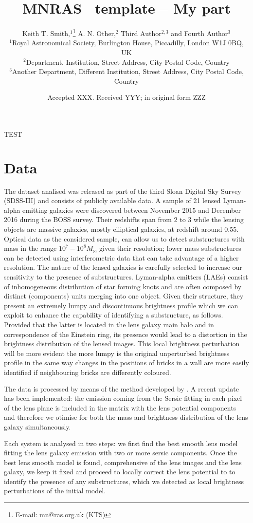 \documentclass[a4paper,fleqn,usenatbib]{mnras}
\title[Short title, max. 45 characters]{MNRAS \LaTeXe\ template -- My part}
\author[K. T. Smith et al.]{
Keith T. Smith,$^{1}$\thanks{E-mail: mn@ras.org.uk (KTS)}
A. N. Other,$^{2}$
Third Author$^{2,3}$
and Fourth Author$^{3}$
\\
$^{1}$Royal Astronomical Society, Burlington House, Piccadilly, London W1J 0BQ, UK\\
$^{2}$Department, Institution, Street Address, City Postal Code, Country\\
$^{3}$Another Department, Different Institution, Street Address, City Postal Code, Country
}
\date{Accepted XXX. Received YYY; in original form ZZZ}
\begin{document}
\label{firstpage}
\pagerange{\pageref{firstpage}--\pageref{lastpage}}
\maketitle


TEST

\section{Data}
The dataset analised was released as part of the third Sloan Digital Sky Survey (SDSS-III) and consists of publicly available data. A sample of 21 lensed Lyman-alpha emitting galaxies were discovered between November 2015 and December 2016 during the BOSS survey. Their redshifts span from 2 to 3 while the lensing objects are massive galaxies, mostly elliptical galaxies, at redshift around 0.55.
Optical data as the considered sample, can allow us to detect substructures with mass in the range $10^7 - 10^8 M_{\odot}$ given their resolution; lower mass substructures can be detected using interferometric data that can take advantage of a higher resolution.
The nature of the lensed galaxies is carefully selected to increase our sensitivity to the presence of substructures. Lyman-alpha emitters (LAEs) consist of inhomogeneous distribution of star forming knots and are often composed by distinct (components) units merging into one object. Given their structure, they present an extremely lumpy and discontinuous brightness profile which we can exploit to enhance the capability of identifying a substructure, as follows. Provided that the latter is located in the lens galaxy main halo and in correspondence of the Einstein ring, its presence would lead to a distortion in the brightness distribution of the lensed images. This local brightness perturbation will be more evident the more lumpy is the original unperturbed brightness profile in the same way changes in the positions of bricks in a wall are more easily identified if neighbouring bricks are differently coloured.

The data is processed by means of the method developed by \citet{method}. A recent update has been implemented: the emission coming from the Sersic fitting in each pixel of the lens plane is included in the matrix with the lens potential components and therefore we otimise for both the mass and brightness distribution of the lens galaxy simultaneously.

Each system is analysed in two steps: we first find the best smooth lens model fitting the lens galaxy emission with two or more sersic components. Once the best lens smooth model is found, comprehensive of the lens images and the lens galaxy, we keep it fixed and proceed to locally correct the lens potential to to identify the presence of any substructures, which we detected as local brightness perturbations of the initial model.
\end{document}
